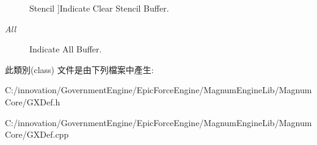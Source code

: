 \begin{Desc}
\begin{description}
{Stencil\hypertarget{class_i_dream_sky_1_1_g_x_clear_mask_a3488ea25a2f985b184588e3bc948fbb3a3cdf590128f4bf811d11bf66de5d2bec}{}\label{class_i_dream_sky_1_1_g_x_clear_mask_a3488ea25a2f985b184588e3bc948fbb3a3cdf590128f4bf811d11bf66de5d2bec}
}]Indicate Clear Stencil Buffer. \item[{\em 
All\hypertarget{class_i_dream_sky_1_1_g_x_clear_mask_a3488ea25a2f985b184588e3bc948fbb3aa82a38dd1cdbf95a503f7a35565b7739}{}\label{class_i_dream_sky_1_1_g_x_clear_mask_a3488ea25a2f985b184588e3bc948fbb3aa82a38dd1cdbf95a503f7a35565b7739}
}]Indicate All Buffer. \end{description}
\end{Desc}


此類別(class) 文件是由下列檔案中產生\+:\begin{DoxyCompactItemize}
\item 
C\+:/innovation/\+Government\+Engine/\+Epic\+Force\+Engine/\+Magnum\+Engine\+Lib/\+Magnum\+Core/G\+X\+Def.\+h\item 
C\+:/innovation/\+Government\+Engine/\+Epic\+Force\+Engine/\+Magnum\+Engine\+Lib/\+Magnum\+Core/G\+X\+Def.\+cpp\end{DoxyCompactItemize}

